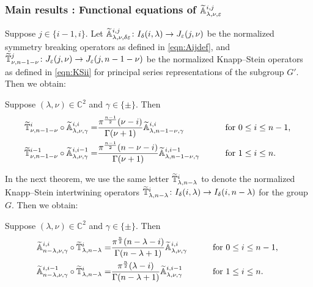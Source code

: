 \subsubsection{Main results : Functional equations of ${\widetilde{\mathbb{A}}}_{{\lambda},{\nu},{\varepsilon}}^{{i,j}}$}
\label{subsec:fiA}
Suppose $j \in \{i-1, i\}$.  
Let ${\widetilde{\mathbb{A}}}_{{\lambda},{\nu},{\delta\varepsilon}}^{{i,j}} \colon I_{\delta}(i,\lambda)
 \to J_{\varepsilon}(j,\nu)$ be the normalized symmetry breaking operators
 as defined in \eqref{eqn:Aijdef}, 
 and $\widetilde{{\mathbb{T}}}_{{\nu},{n-1-\nu}}^{{j}} \colon J_{\varepsilon}(j,\nu) \to J_{\varepsilon}(j,n-1-\nu)$
 be the normalized 
Knapp--Stein operators
 as defined in \eqref{eqn:KSii}
 for principal series representations
 of the subgroup $G'$.  
Then we obtain:
\begin{theorem}
\label{thm:TAA}
Suppose $(\lambda,\nu) \in {\mathbb{C}}^2$
 and $\gamma \in \{ \pm \}$.  
Then 
\begin{alignat*}{2}
\widetilde{{\mathbb{T}}}_{{\nu},{n-1-\nu}}^{{i}}
\circ
{\widetilde{\mathbb{A}}}_{{\lambda},{\nu},{\gamma}}^{{i,i}}
=&
\frac{\pi^{\frac{n-1}{2}} (\nu-i)}{\Gamma(\nu +1)}
{\widetilde{\mathbb{A}}}_{{\lambda},{n-1-\nu},{\gamma}}^{{i, i}}
\qquad
&&\text{for $0 \le i \le n-1$, }
\\
\widetilde{{\mathbb{T}}}_{{\nu},{n-1-\nu}}^{{i-1}}
\circ
{\widetilde{\mathbb{A}}}_{{\lambda},{\nu},{\gamma}}^{{i,i-1}}
=&
\frac{\pi^{\frac{n-1}{2}} (n-\nu-i)}{\Gamma(\nu +1)}
{\widetilde{\mathbb{A}}}_{{\lambda},{n-1-\nu},{\gamma}}^{{i,i-1}}
\qquad
&&\text{for $1 \le i \le n$.  }  
\end{alignat*}
\end{theorem}
In the next theorem,
 we use the same letter $\widetilde{{\mathbb{T}}}_{{\lambda},{n-\lambda}}^{{i}}$
 to denote the normalized Knapp--Stein intertwining operators
 $\widetilde{{\mathbb{T}}}_{{\lambda},{n-\lambda}}^{{i}} \colon I_{\delta}(i,\lambda) \to I_{\delta}(i,n-\lambda)$
 for the group $G$.  
Then we obtain:
\begin{theorem}
\label{thm:ATA}
Suppose $(\lambda,\nu) \in {\mathbb{C}}^2$
 and $\gamma \in \{ \pm \}$.  
Then 
\begin{alignat*}{2}
{\widetilde{\mathbb{A}}}_{{n-\lambda},{\nu},{\gamma}}^{{i,i}}
\circ
\widetilde{{\mathbb{T}}}_{{\lambda},{n-\lambda}}^{{i}}
=&
\frac{\pi^{\frac{n}{2}} (n-\lambda-i)}{\Gamma(n-\lambda +1)}
{\widetilde{\mathbb{A}}}_{{\lambda},{\nu},{\gamma}}^{{i,i}}
\qquad
&&\text{for $0 \le i \le n-1$, }
\\
{\widetilde{\mathbb{A}}}_{{n-\lambda},{\nu},{\gamma}}^{{i,i-1}}
\circ
\widetilde{{\mathbb{T}}}_{{\lambda},{n-\lambda}}^{{i}}
=&
\frac{\pi^{\frac{n}{2}} (\lambda-i)}{\Gamma(n-\lambda +1)}
{\widetilde{\mathbb{A}}}_{{\lambda},{\nu},{\gamma}}^{{i,i-1}}
\qquad
&&\text{for $1 \le i \le n$.}
\end{alignat*}
\end{theorem}

